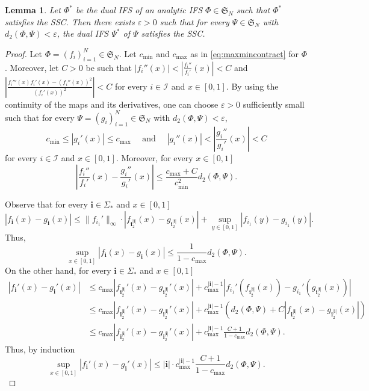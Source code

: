 \documentclass[11pt,a4paper]{article}
\def\cref#1{\ref{#1}}%
\newtheorem{lemma}[theorem]{Lemma}
\theoremstyle{definition}
\theoremstyle{remark}
\newcommand{\0}{\mathbf{0}}
\newcommand{\bi}{\mathbf{i}}
\numberwithin{equation}{section}
\begin{document}
\begin{lemma}\label{lem:cont}
  Let $\Phi^*$ be the dual IFS of an analytic IFS $\Phi\in\mathfrak{S}_N$ such that $\Phi^*$
  satisfies the SSC. Then there exists $\varepsilon>0$ such that for every $\Psi\in\mathfrak{S}_N$
  with $d_2(\Phi,\Psi)<\varepsilon$, the dual IFS $\Psi^*$ of $\Psi$ satisfies the SSC.
\end{lemma}

\begin{proof}
  Let $\Phi=(f_i)_{i=1}^N\in\mathfrak{S}_N$. Let $c_{\min}$ and $c_{\max}$ as in
  \cref{eq:maxmincontract} for $\Phi$. Moreover, let $C>0$ be such that
  $|f_i''(x)|<\left|\frac{f_i''}{f_i'}(x)\right|<C$ and
  $\left|\frac{f_i'''(x)f_i'(x)-(f_i''(x))^2}{(f_i'(x))^2}\right|<C$ for every $i\in\mathcal{I}$ and
  $x\in[0,1]$. By using the continuity of the maps and its derivatives, one can choose
  $\varepsilon>0$ sufficiently small such that for every $\Psi=(g_i)_{i=1}^N\in\mathfrak{S}_N$ with
  $d_2(\Phi,\Psi)<\varepsilon$, 
  $$
  c_{\min}\leq|g_i'(x)|\leq c_{\max}\quad\text{ and }\quad |g_i''(x)|<\left|\frac{g_i''}{g_i'}(x)\right|<C
  $$
  for every $i\in\mathcal{I}$ and $x\in[0,1]$. Moreover, for every $x\in[0,1]$
  \begin{equation}\label{eq:tec1}
    \left|\frac{f_i''}{f_i'}(x)-\frac{g_i''}{g_i'}(x)\right|\leq
    \frac{c_{\max}+C}{c_{\min}^{2}}d_2(\Phi,\Psi).
  \end{equation}

  Observe that for every $\bi\in\Sigma_*$ and $x\in[0,1]$
  $$
  |f_{\bi}(x)-g_{\bi}(x)|\leq\|f_{i_1}'\|_{\infty}\cdot
  |f_{\bi_2^{|\bi|}}(x)-g_{\bi_2^{|\bi|}}(x)|+\sup_{y\in[0,1]}|f_{i_1}(y)-g_{i_1}(y)|.
  $$ 
  Thus,
  \begin{equation}\label{eq:tec2}
    \sup_{x\in[0,1]}|f_{\bi}(x)-g_{\bi}(x)|\leq \frac{1}{1-c_{\max}}d_2(\Phi,\Psi).
  \end{equation}
  On the other hand, for every $\bi\in\Sigma_*$ and $x\in[0,1]$
  \begin{align*}
    |f_{\bi}'(x)-g_{\bi}'(x)|
    &\leq
    c_{\max}|f_{\bi_2^{|\bi|}}'(x)-g_{\bi_2^{|\bi|}}'(x)|+
    c_{\max}^{|\bi|-1}|f_{i_1}'(f_{\bi_2^{|\bi|}}(x))-g_{i_1}'(g_{\bi_2^{|\bi|}}(x))|\\
    &\leq c_{\max}|f_{\bi_2^{|\bi|}}'(x)-g_{\bi_2^{|\bi|}}'(x)|+c_{\max}^{|\bi|-1}\left(d_2(\Phi,\Psi)+C|f_{\bi_2^{|\bi|}}(x)-g_{\bi_2^{|\bi|}}(x)|\right)\\
    &\leq c_{\max}|f_{\bi_2^{|\bi|}}'(x)-g_{\bi_2^{|\bi|}}'(x)|+c_{\max}^{|\bi|-1}\frac{C+1}{1-c_{\max}}d_2(\Phi,\Psi).
  \end{align*}
  Thus, by induction
  \begin{equation}\label{eq:tec3}
    \sup_{x\in[0,1]}|f_{\bi}'(x)-g_{\bi}'(x)|\leq |\bi|\cdot c_{\max}^{|\bi|-1}\frac{C+1}{1-c_{\max}}d_2(\Phi,\Psi).
  \end{equation}


\end{proof}
\end{document}
